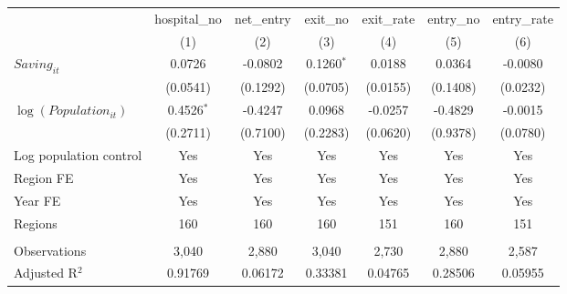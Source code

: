 \begingroup
\centering
\begin{tabular}{lcccccc}
   \toprule
                            & hospital\_no  & net\_entry  & exit\_no     & exit\_rate  & entry\_no  & entry\_rate \\    
                            & (1)           & (2)         & (3)          & (4)         & (5)        & (6)\\  
   \midrule 
   $Saving_{it}$            & 0.0726        & -0.0802     & 0.1260$^{*}$ & 0.0188      & 0.0364     & -0.0080\\   
                            & (0.0541)      & (0.1292)    & (0.0705)     & (0.0155)    & (0.1408)   & (0.0232)\\   
   $\log(Population_{it})$  & 0.4526$^{*}$  & -0.4247     & 0.0968       & -0.0257     & -0.4829    & -0.0015\\   
                            & (0.2711)      & (0.7100)    & (0.2283)     & (0.0620)    & (0.9378)   & (0.0780)\\   
   Log population control   & Yes           & Yes         & Yes          & Yes         & Yes        & Yes\\  
   Region FE                & Yes           & Yes         & Yes          & Yes         & Yes        & Yes\\  
   Year FE                  & Yes           & Yes         & Yes          & Yes         & Yes        & Yes\\  
   Regions                  & 160           & 160         & 160          & 151         & 160        & 151\\  
    \\
   Observations             & 3,040         & 2,880       & 3,040        & 2,730       & 2,880      & 2,587\\  
   Adjusted R$^2$           & 0.91769       & 0.06172     & 0.33381      & 0.04765     & 0.28506    & 0.05955\\  
   \bottomrule
\end{tabular}
\par\endgroup
